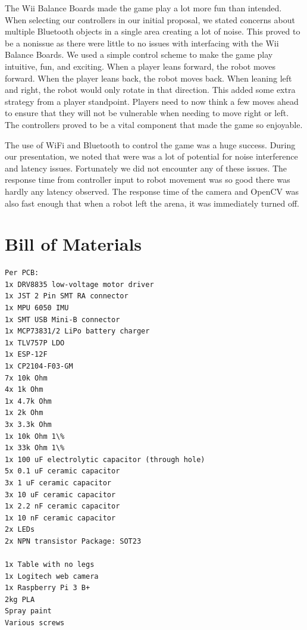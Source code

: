 \documentclass[11pt]{ieeeconf}
\begin{document}
The Wii Balance Boards made the game play a lot more fun than intended. When selecting our controllers in our initial proposal, we stated concerns about multiple Bluetooth objects in a single area creating a lot of noise. This proved to be a nonissue as there were little to no issues with interfacing with the Wii Balance Boards. We used a simple control scheme to make the game play intuitive, fun, and exciting. When a player leans forward, the robot moves forward. When the player leans back, the robot moves back. When leaning left and right, the robot would only rotate in that direction. This added some extra strategy from a player standpoint. Players need to now think a few moves ahead to ensure that they will not be vulnerable when needing to move right or left. The controllers proved to be a vital component that made the game so enjoyable.

The use of WiFi and Bluetooth to control the game was a huge success. During our presentation, we noted that were was a lot of potential for noise interference and latency issues. Fortunately we did not encounter any of these issues. The response time from controller input to robot movement was so good there was hardly any latency observed. The response time of the camera and OpenCV was also fast enough that when a robot left the arena, it was immediately turned off. 

\section{Bill of Materials}

\begin{lstlisting}
Per PCB:
1x DRV8835 low-voltage motor driver
1x JST 2 Pin SMT RA connector
1x MPU 6050 IMU
1x SMT USB Mini-B connector
1x MCP73831/2 LiPo battery charger
1x TLV757P LDO
1x ESP-12F
1x CP2104-F03-GM
7x 10k Ohm 
4x 1k Ohm 
1x 4.7k Ohm 
1x 2k Ohm 
3x 3.3k Ohm 
1x 10k Ohm 1\%
1x 33k Ohm 1\%
1x 100 uF electrolytic capacitor (through hole)
5x 0.1 uF ceramic capacitor 
3x 1 uF ceramic capacitor 
3x 10 uF ceramic capacitor 
1x 2.2 nF ceramic capacitor 
1x 10 nF ceramic capacitor 
2x LEDs
2x NPN transistor Package: SOT23

1x Table with no legs
1x Logitech web camera
1x Raspberry Pi 3 B+
2kg PLA
Spray paint
Various screws
\end{lstlisting}
\end{document}
